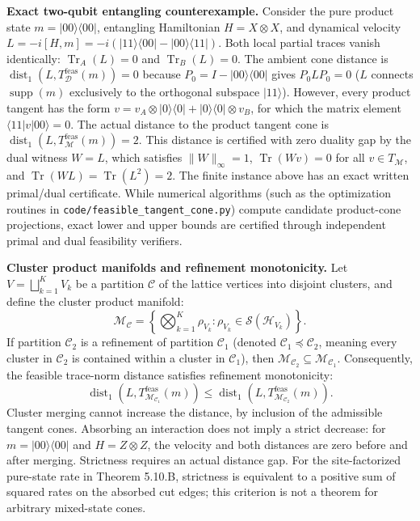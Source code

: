 \documentclass[
  11pt,
]{article}
\begin{document}
\textbf{Exact two-qubit entangling counterexample.}
Consider the pure product state \(m = |00\rangle\langle 00|\), entangling Hamiltonian \(H = X \otimes X\), and dynamical velocity \(L = -i[H, m] = -i(|11\rangle\langle 00| - |00\rangle\langle 11|)\).
Both local partial traces vanish identically: \(\operatorname{Tr}_A(L) = 0\) and \(\operatorname{Tr}_B(L) = 0\).
The ambient cone distance is \(\operatorname{dist}_1(L, T_{\mathcal D}^{\mathrm{feas}}(m)) = 0\) because \(P_0 = I - |00\rangle\langle 00|\) gives \(P_0 L P_0 = 0\) (\(L\) connects \(\operatorname{supp}(m)\) exclusively to the orthogonal subspace \(|11\rangle\)).
However, every product tangent has the form \(v = v_A \otimes |0\rangle\langle 0| + |0\rangle\langle 0| \otimes v_B\), for which the matrix element \(\langle 11| v |00\rangle = 0\).
The actual distance to the product tangent cone is \(\operatorname{dist}_1(L, T_{\mathcal M}^{\mathrm{feas}}(m)) = 2\).
This distance is certified with zero duality gap by the dual witness \(W = L\), which satisfies \(\lVert W\rVert_\infty = 1\), \(\operatorname{Tr}(W v) = 0\) for all \(v \in T_{\mathcal M}\), and \(\operatorname{Tr}(W L) = \operatorname{Tr}(L^2) = 2\).
The finite instance above has an exact written primal/dual certificate.
While numerical algorithms (such as the optimization routines in \texttt{code/feasible\_tangent\_cone.py}) compute candidate product-cone projections, exact lower and upper bounds are certified through independent primal and dual feasibility verifiers.

\textbf{Cluster product manifolds and refinement monotonicity.} Let \(V = \bigsqcup_{k=1}^K V_k\) be a partition \(\mathcal C\) of the lattice vertices into disjoint clusters, and define the cluster product manifold:
\[
\mathcal M_{\mathcal C} = \left\{ \bigotimes_{k=1}^K \rho_{V_k} : \rho_{V_k} \in \mathcal S(\mathcal H_{V_k}) \right\}.
\]
If partition \(\mathcal C_2\) is a refinement of partition \(\mathcal C_1\) (denoted \(\mathcal C_1 \preceq \mathcal C_2\), meaning every cluster in \(\mathcal C_2\) is contained within a cluster in \(\mathcal C_1\)), then \(\mathcal M_{\mathcal C_2} \subseteq \mathcal M_{\mathcal C_1}\).
Consequently, the feasible trace-norm distance satisfies refinement monotonicity:
\[
\operatorname{dist}_1(L, T_{\mathcal M_{\mathcal C_1}}^{\mathrm{feas}}(m)) \le \operatorname{dist}_1(L, T_{\mathcal M_{\mathcal C_2}}^{\mathrm{feas}}(m)).
\]
Cluster merging cannot increase the distance, by inclusion of the admissible
tangent cones. Absorbing an interaction does not imply a strict decrease:
for \(m=|00\rangle\langle00|\) and \(H=Z\otimes Z\), the velocity and both
distances are zero before and after merging. Strictness requires an actual
distance gap. For the site-factorized pure-state rate in Theorem 5.10.B,
strictness is equivalent to a positive sum of squared rates on the absorbed
cut edges; this criterion is not a theorem for arbitrary mixed-state cones.
\end{document}
